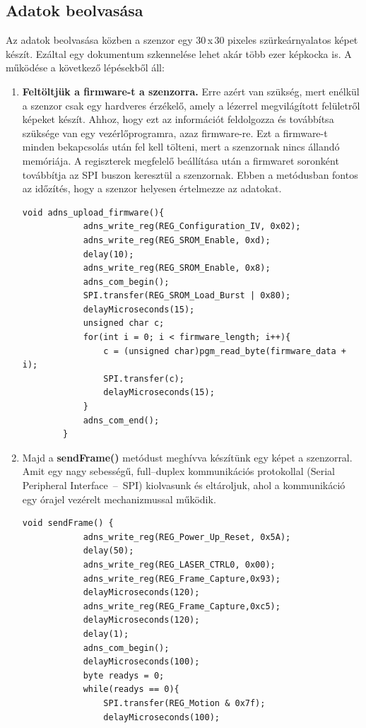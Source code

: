 \documentclass[]{thesis-ekf}
\theoremstyle{definition}
\theoremstyle{remark}
\begin{document}
\subsection{Adatok beolvasása}
Az adatok beolvasása közben a szenzor egy 30\,x\,30 pixeles szürkeárnyalatos képet készít. Ezáltal egy dokumentum szkennelése lehet akár több ezer képkocka is.\cite{adns9800_code}
A működése a következő lépésekből áll:
\begin{enumerate}
	\item \textbf{Feltöltjük a firmware-t a szenzorra.} Erre azért van szükség, mert enélkül a szenzor csak egy hardveres érzékelő, amely a lézerrel megvilágított felületről képeket készít. Ahhoz, hogy ezt az információt feldolgozza és továbbítsa szüksége van egy vezérlőprogramra, azaz firmware-re. Ezt a firmware-t minden bekapcsolás után fel kell tölteni, mert a szenzornak nincs állandó memóriája. A regiszterek megfelelő beállítása után a firmwaret soronként továbbítja  az SPI buszon keresztül a szenzornak. Ebben a metódusban fontos az időzítés, hogy a szenzor helyesen értelmezze az adatokat. \cite{arduino_latex}
	\begin{lstlisting}[language=Arduino,label=upload-firmware-code]
		void adns_upload_firmware(){
			adns_write_reg(REG_Configuration_IV, 0x02);	
			adns_write_reg(REG_SROM_Enable, 0xd); 
			delay(10); 
			adns_write_reg(REG_SROM_Enable, 0x8); 
			adns_com_begin();
			SPI.transfer(REG_SROM_Load_Burst | 0x80); 
			delayMicroseconds(15);
			unsigned char c;
			for(int i = 0; i < firmware_length; i++){ 
				c = (unsigned char)pgm_read_byte(firmware_data + i);
				SPI.transfer(c);
				delayMicroseconds(15); 
			}
			adns_com_end();
		}
	\end{lstlisting}
	\item Majd a \textbf{sendFrame()} metódust meghívva készítünk egy képet a szenzorral. Amit egy nagy sebességű, full--duplex kommunikációs protokollal (Serial Peripheral Interface~--~SPI)\cite{serial} kiolvasunk és eltároljuk, ahol a kommunikáció egy órajel vezérelt mechanizmussal működik. 
	\begin{lstlisting}[language=Arduino,label=sendFrame]
		void sendFrame() {
			adns_write_reg(REG_Power_Up_Reset, 0x5A);
			delay(50);
			adns_write_reg(REG_LASER_CTRL0, 0x00);
			adns_write_reg(REG_Frame_Capture,0x93);
			delayMicroseconds(120); 
			adns_write_reg(REG_Frame_Capture,0xc5);
			delayMicroseconds(120); 
			delay(1); 
			adns_com_begin(); 
			delayMicroseconds(100); 
			byte readys = 0;
			while(readys == 0){
				SPI.transfer(REG_Motion & 0x7f);
				delayMicroseconds(100); 

\end{lstlisting}
\end{enumerate}
\end{document}
